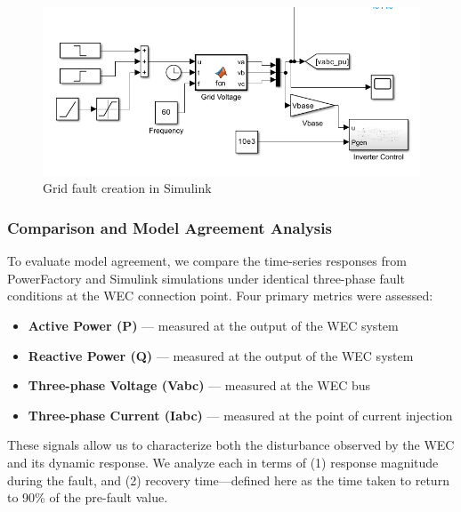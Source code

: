 \documentclass[conference]{IEEEtran}
\newcommand{\mycomment}[1]{}
\begin{document}
\begin{figure}[t]
            \centering
            \includegraphics[width=1.0\linewidth, frame]{grid voltage emulation.png}
            \caption{Grid fault creation in Simulink}
            \label{fig:P}
        \end{figure}


        \mycomment{might need to explain some parameters differences, or not? }

    \vspace{10pt}
    
    \subsubsection{Comparison and Model Agreement Analysis}
    
    To evaluate model agreement, we compare the time-series responses from PowerFactory and Simulink simulations under identical three-phase fault conditions at the WEC connection point. Four primary metrics were assessed:
    
    \begin{itemize}
        \item \textbf{Active Power (P)} — measured at the output of the WEC system
        \item \textbf{Reactive Power (Q)} — measured at the output of the WEC system
        \item \textbf{Three-phase Voltage (Vabc)} — measured at the WEC bus
        \item \textbf{Three-phase Current (Iabc)} — measured at the point of current injection
    \end{itemize}
    
    These signals allow us to characterize both the disturbance observed by the WEC and its dynamic response. We analyze each in terms of (1) response magnitude during the fault, and (2) recovery time—defined here as the time taken to return to 90\% of the pre-fault value.
    
\end{document}
